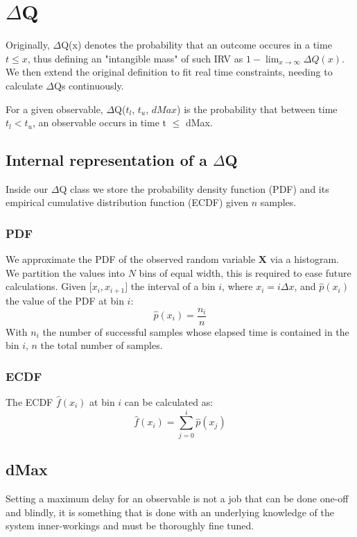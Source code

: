 \section{$\Delta$Q}

Originally, $\Delta$Q(x) denotes the probability that an outcome occures in a time $t \le x$, thus defining an "intangible mass" of such IRV as $1 - \lim_{x\to\infty} \Delta Q (x)$.
We then extend the original definition to fit real time constraints, needing to calculate $\Delta$Qs continuously.

For a given observable, $\Delta$Q($t_l$, $t_u$, $dMax$) is the probability that between time $t_l < t_u$, an observable occurs in time t $\le$ dMax.

\subsection{Internal representation of a $\Delta$Q}

        Inside our $\Delta$Q class we store the probability density function (PDF) and its empirical cumulative distribution function (ECDF) given $n$ samples. 
    \subsubsection{PDF}
  We approximate the PDF of the observed random variable $\textbf{X}$ via a histogram. We partition the values into $N$ bins of equal width, this is required to ease future calculations.
        Given $\lbrack x_i, x_{i+1} \rbrack$ the interval of a bin $i$, where $x_i = i\Delta x$, and $\hat{p}(x_i)$ the value of the PDF at bin $i$:
        \begin{equation}
            \hat{p}(x_i) = \dfrac{n_i}{n}
            \label{eq:pdf}
        \end{equation}
   With $n_i$ the number of successful samples whose elapsed time is contained in the bin $i$, $n$ the total number of samples.
\subsubsection{ECDF}
    The ECDF $\hat{f}(x_i)$ at bin $i$ can  be calculated as:
    \begin{equation}
            \hat{f}(x_i) = \sum_{j=0}^{i} \hat{p}(x_j)
        \label{eq:cdf}
    \end{equation}

\subsection{dMax}
Setting a maximum delay for an observable is not a job that can be done one-off and blindly, it is something that is done with an underlying knowledge of the system inner-workings and must be thoroughly fine tuned. 

